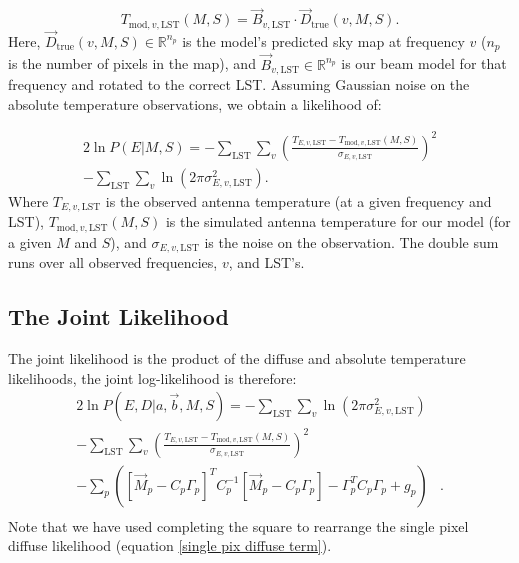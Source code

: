 \documentclass[fleqn,usenatbib]{mnras}
\begin{document}
\begin{equation}
\label{simulated EDGES temp at LST and v}
    T_{\mathrm{mod},v,\mathrm{LST}}(M,S) = \Vec{B}_{v,\mathrm{LST}}\cdot \Vec{D}_{\mathrm{true}}(v,M,S).
\end{equation}
Here, $\Vec{D}_{\mathrm{true}}(v,M,S) \in \mathbb{R}^{n_p}$ is the model's predicted sky map at frequency $v$ ($n_p$ is the number of pixels in the map), and $\Vec{B}_{v,\mathrm{LST}}\in \mathbb{R}^{n_p}$ is our beam model for that frequency and rotated to the correct LST. Assuming Gaussian noise on the absolute temperature observations, we obtain a likelihood of:

\begin{multline}
    \label{EDGES likelihood term}
    2\ln{P\left(E|M,S\right)} = -\sum_\mathrm{LST}\sum_v \left(\frac{T_{E,v,\mathrm{LST}} - T_{\mathrm{mod},v,\mathrm{LST}}(M,S)}{\sigma_{E,v,\mathrm{LST}}}\right)^2 \\- \sum_\mathrm{LST}\sum_v\ln{\left(2\pi\sigma_{E,v,\mathrm{LST}}^2\right)}.
\end{multline}
Where $T_{E,v,\mathrm{LST}}$ is the observed antenna temperature (at a given frequency and LST), $T_{\mathrm{mod},v,\mathrm{LST}}(M,S)$ is the simulated antenna temperature for our model (for a given $M$ and $S$), and $\sigma_{E,v,\mathrm{LST}}$ is the noise on the observation. The double sum runs over all observed frequencies, $v$, and LST's.

\subsection{The Joint Likelihood}
The joint likelihood is the product of the diffuse and absolute temperature likelihoods, the joint log-likelihood is therefore:
\begin{equation}
\label{final joint likelihood with calibration}
\begin{aligned}
    2\ln P\left(E,D|a,\Vec{b},M,S\right) = - \sum_\mathrm{LST}\sum_v\ln{\left(2\pi\sigma_{E,v,\mathrm{LST}}^2\right)}&\\-\sum_\mathrm{LST}\sum_v \left(\frac{T_{E, v,\mathrm{LST}} - T_{\mathrm{mod},v,\mathrm{LST}}(M,S)}{\sigma_{E,v,\mathrm{LST}}}\right)^2& \\ 
    -\sum_p\left(\left[\Vec{M}_p - C_p\Gamma_p\right]^T C_p^{-1} \left[\Vec{M}_p - C_p\Gamma_p\right] - \Gamma_p^T C_p \Gamma_p +g_p\right)&.\\
\end{aligned}
\end{equation}
Note that we have used completing the square to rearrange the single pixel diffuse likelihood (equation \ref{single pix diffuse term}).
\end{document}
